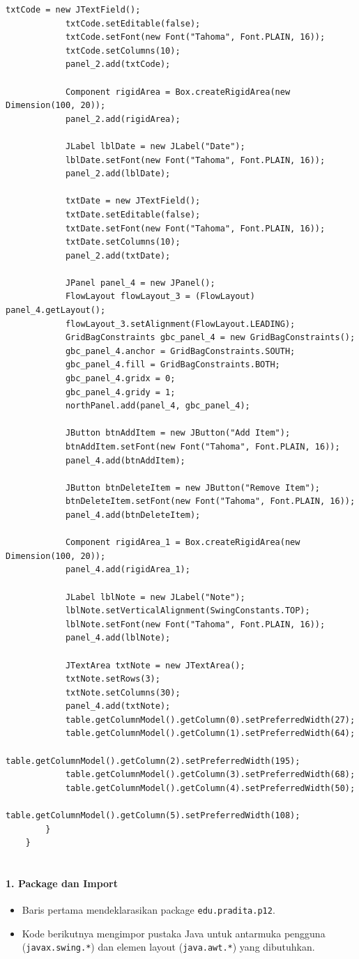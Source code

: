 \begin{lstlisting}[style=JavaStyle]
			txtCode = new JTextField();
			txtCode.setEditable(false);
			txtCode.setFont(new Font("Tahoma", Font.PLAIN, 16));
			txtCode.setColumns(10);
			panel_2.add(txtCode);
			
			Component rigidArea = Box.createRigidArea(new Dimension(100, 20));
			panel_2.add(rigidArea);
			
			JLabel lblDate = new JLabel("Date");
			lblDate.setFont(new Font("Tahoma", Font.PLAIN, 16));
			panel_2.add(lblDate);
			
			txtDate = new JTextField();
			txtDate.setEditable(false);
			txtDate.setFont(new Font("Tahoma", Font.PLAIN, 16));
			txtDate.setColumns(10);
			panel_2.add(txtDate);
			
			JPanel panel_4 = new JPanel();
			FlowLayout flowLayout_3 = (FlowLayout) panel_4.getLayout();
			flowLayout_3.setAlignment(FlowLayout.LEADING);
			GridBagConstraints gbc_panel_4 = new GridBagConstraints();
			gbc_panel_4.anchor = GridBagConstraints.SOUTH;
			gbc_panel_4.fill = GridBagConstraints.BOTH;
			gbc_panel_4.gridx = 0;
			gbc_panel_4.gridy = 1;
			northPanel.add(panel_4, gbc_panel_4);
			
			JButton btnAddItem = new JButton("Add Item");
			btnAddItem.setFont(new Font("Tahoma", Font.PLAIN, 16));
			panel_4.add(btnAddItem);
			
			JButton btnDeleteItem = new JButton("Remove Item");
			btnDeleteItem.setFont(new Font("Tahoma", Font.PLAIN, 16));
			panel_4.add(btnDeleteItem);
			
			Component rigidArea_1 = Box.createRigidArea(new Dimension(100, 20));
			panel_4.add(rigidArea_1);
			
			JLabel lblNote = new JLabel("Note");
			lblNote.setVerticalAlignment(SwingConstants.TOP);
			lblNote.setFont(new Font("Tahoma", Font.PLAIN, 16));
			panel_4.add(lblNote);
			
			JTextArea txtNote = new JTextArea();
			txtNote.setRows(3);
			txtNote.setColumns(30);
			panel_4.add(txtNote);
			table.getColumnModel().getColumn(0).setPreferredWidth(27);
			table.getColumnModel().getColumn(1).setPreferredWidth(64);
			table.getColumnModel().getColumn(2).setPreferredWidth(195);
			table.getColumnModel().getColumn(3).setPreferredWidth(68);
			table.getColumnModel().getColumn(4).setPreferredWidth(50);
			table.getColumnModel().getColumn(5).setPreferredWidth(108);
		}
	}
	
\end{lstlisting}

\paragraph{1. Package dan Import}
\begin{itemize}
	\item Baris pertama mendeklarasikan package \texttt{edu.pradita.p12}.
	\item Kode berikutnya mengimpor pustaka Java untuk antarmuka pengguna (\texttt{javax.swing.*}) dan elemen layout (\texttt{java.awt.*}) yang dibutuhkan.
\end{itemize}

